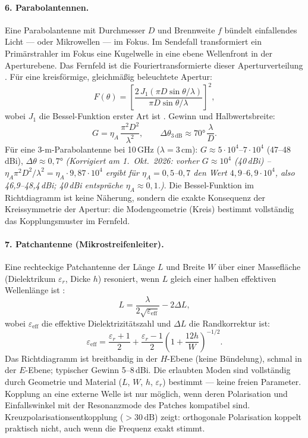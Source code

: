 \paragraph{6. Parabolantennen.}

Eine Parabolantenne mit Durchmesser $D$ und Brennweite $f$ bündelt einfallendes
Licht --- oder Mikrowellen --- im Fokus. Im Sendefall transformiert ein
Primärstrahler im Fokus eine Kugelwelle in eine ebene Wellenfront in der
Aperturebene. Das Fernfeld ist die Fouriertransformierte dieser Aperturverteilung
\EM. Für eine kreisförmige, gleichmäßig beleuchtete Apertur:
\[
  F(\theta) = \left[\frac{2\,J_1(\pi D\sin\theta/\lambda)}
                        {\pi D\sin\theta/\lambda}\right]^2,
\]
wobei $J_1$ die Bessel-Funktion erster Art ist \cite{Balanis2016}. Gewinn und Halbwertsbreite:
\[
  G = \eta_A\,\frac{\pi^2 D^2}{\lambda^2}, \qquad
  \Delta\theta_{3\,\mathrm{dB}} \approx 70°\,\frac{\lambda}{D}.
\]
Für eine 3-m-Parabolantenne bei 10\,GHz ($\lambda = 3\,\mathrm{cm}$):
$G \approx 5\cdot10^4$--$7\cdot10^4$ (47--48\,dBi), $\Delta\theta \approx 0{,}7°$
\textit{(Korrigiert am 1.~Okt.~2026: vorher $G \approx 10^4$ (40\,dBi) -- $\eta_A\pi^2D^2/\lambda^2 = \eta_A\cdot9{,}87\cdot10^4$ ergibt für $\eta_A = 0{,}5$--$0{,}7$ den Wert $4{,}9$--$6{,}9\cdot10^4$, also 46,9--48,4\,dBi; 40\,dBi entspräche $\eta_A \approx 0{,}1$.)}. Die Bessel-Funktion
im Richtdiagramm ist keine Näherung, sondern die exakte Konsequenz der
Kreissymmetrie der Apertur: die Modengeometrie (Kreis) bestimmt vollständig
das Kopplungsmuster im Fernfeld.

\paragraph{7. Patchantenne (Mikrostreifenleiter).}

Eine rechteckige Patchantenne der Länge $L$ und Breite $W$ über einer
Massefläche (Dielektrikum $\varepsilon_r$, Dicke $h$) resoniert, wenn
$L$ gleich einer halben effektiven Wellenlänge ist \cite{Pozar2012,Balanis2016}:
\[
  L = \frac{\lambda}{2\sqrt{\varepsilon_\mathrm{eff}}} - 2\Delta L,
\]
wobei $\varepsilon_\mathrm{eff}$ die effektive Dielektrizitätszahl und
$\Delta L$ die Randkorrektur ist:
\[
  \varepsilon_\mathrm{eff} = \frac{\varepsilon_r+1}{2}
    + \frac{\varepsilon_r-1}{2}\left(1 + \frac{12h}{W}\right)^{-1/2}.
\]
Das Richtdiagramm ist breitbandig in der $H$-Ebene (keine Bündelung), schmal
in der $E$-Ebene; typischer Gewinn 5--8\,dBi. Die erlaubten Moden sind
vollständig durch Geometrie und Material ($L$, $W$, $h$, $\varepsilon_r$)
bestimmt --- keine freien Parameter. Kopplung an eine externe Welle ist nur
möglich, wenn deren Polarisation und Einfallswinkel mit der Resonanzmode
des Patches kompatibel sind. Kreuz\-po\-la\-ri\-sa\-ti\-ons\-ent\-kopp\-lung ($> 30\,\mathrm{dB}$)
zeigt: orthogonale Polarisation koppelt praktisch nicht, auch wenn die
Frequenz exakt stimmt.

